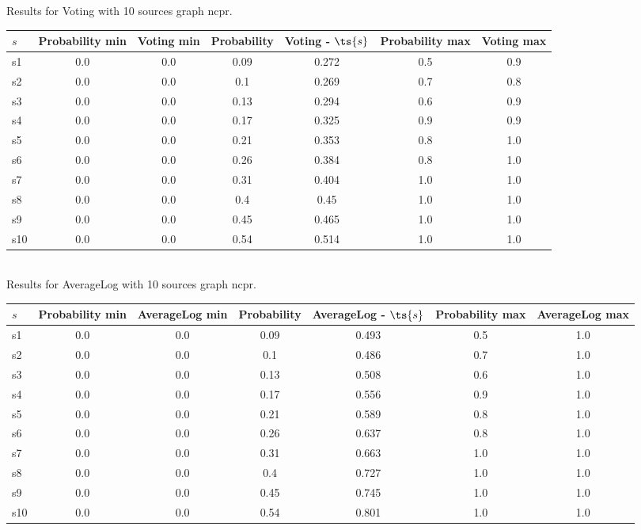\documentclass{article}
\begin{document}
\noindent Results for Voting with 10 sources graph ncpr.

\noindent\begin{tabular}{|l|c|c|c|c|c|c|}
\hline
$s$& Probability min & Voting min & Probability & Voting - $\ts{s}$ & Probability max & Voting max\\
\hline
s1 &0.0 & 0.0 & 0.09 & 0.272 & 0.5 & 0.9\\
\hline
s2 &0.0 & 0.0 & 0.1 & 0.269 & 0.7 & 0.8\\
\hline
s3 &0.0 & 0.0 & 0.13 & 0.294 & 0.6 & 0.9\\
\hline
s4 &0.0 & 0.0 & 0.17 & 0.325 & 0.9 & 0.9\\
\hline
s5 &0.0 & 0.0 & 0.21 & 0.353 & 0.8 & 1.0\\
\hline
s6 &0.0 & 0.0 & 0.26 & 0.384 & 0.8 & 1.0\\
\hline
s7 &0.0 & 0.0 & 0.31 & 0.404 & 1.0 & 1.0\\
\hline
s8 &0.0 & 0.0 & 0.4 & 0.45 & 1.0 & 1.0\\
\hline
s9 &0.0 & 0.0 & 0.45 & 0.465 & 1.0 & 1.0\\
\hline
s10 &0.0 & 0.0 & 0.54 & 0.514 & 1.0 & 1.0\\
\hline
\end{tabular}\\

\noindent Results for AverageLog with 10 sources graph ncpr.

\noindent\begin{tabular}{|l|c|c|c|c|c|c|}
\hline
$s$& Probability min & AverageLog min & Probability & AverageLog - $\ts{s}$ & Probability max & AverageLog max\\
\hline
s1 &0.0 & 0.0 & 0.09 & 0.493 & 0.5 & 1.0\\
\hline
s2 &0.0 & 0.0 & 0.1 & 0.486 & 0.7 & 1.0\\
\hline
s3 &0.0 & 0.0 & 0.13 & 0.508 & 0.6 & 1.0\\
\hline
s4 &0.0 & 0.0 & 0.17 & 0.556 & 0.9 & 1.0\\
\hline
s5 &0.0 & 0.0 & 0.21 & 0.589 & 0.8 & 1.0\\
\hline
s6 &0.0 & 0.0 & 0.26 & 0.637 & 0.8 & 1.0\\
\hline
s7 &0.0 & 0.0 & 0.31 & 0.663 & 1.0 & 1.0\\
\hline
s8 &0.0 & 0.0 & 0.4 & 0.727 & 1.0 & 1.0\\
\hline
s9 &0.0 & 0.0 & 0.45 & 0.745 & 1.0 & 1.0\\
\hline
s10 &0.0 & 0.0 & 0.54 & 0.801 & 1.0 & 1.0\\
\hline
\end{tabular}\\
\end{document}

